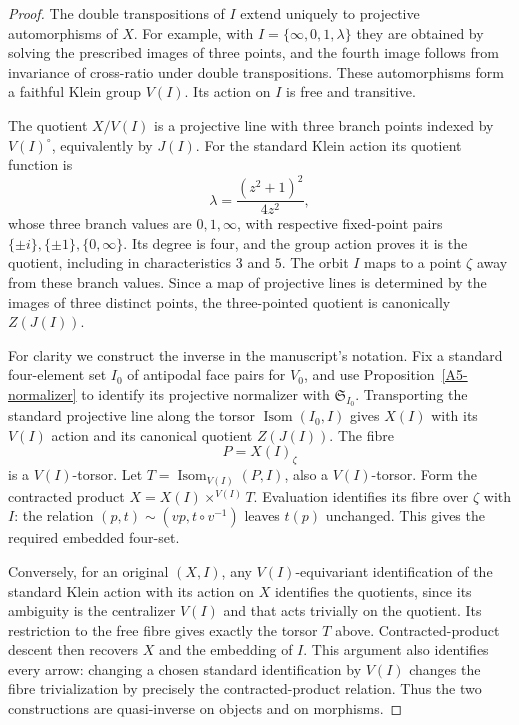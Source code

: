 \begin{proof}
The double transpositions of $I$ extend uniquely to projective automorphisms of $X$. For example, with $I=\{\infty,0,1,\lambda\}$ they are obtained by solving the prescribed images of three points, and the fourth image follows from invariance of cross-ratio under double transpositions. These automorphisms form a faithful Klein group $V(I)$. Its action on $I$ is free and transitive.

The quotient $X/V(I)$ is a projective line with three branch points indexed by $V(I)^\circ$, equivalently by $J(I)$. For the standard Klein action its quotient function is
\[
 \lambda=\frac{(z^2+1)^2}{4z^2},
\]
whose three branch values are $0,1,\infty$, with respective fixed-point pairs $\{\pm i\},\{\pm1\},\{0,\infty\}$. Its degree is four, and the group action proves it is the quotient, including in characteristics $3$ and $5$. The orbit $I$ maps to a point $\zeta$ away from these branch values. Since a map of projective lines is determined by the images of three distinct points, the three-pointed quotient is canonically $Z(J(I))$.

For clarity we construct the inverse in the manuscript's notation. Fix a standard four-element set $I_0$ of antipodal face pairs for $V_0$, and use Proposition~\ref{A5-normalizer} to identify its projective normalizer with $\mathfrak S_{I_0}$. Transporting the standard projective line along the torsor $\operatorname{Isom}(I_0,I)$ gives $X(I)$ with its $V(I)$ action and its canonical quotient $Z(J(I))$. The fibre
\[
 P=X(I)_\zeta
\]
is a $V(I)$-torsor. Let $T=\operatorname{Isom}_{V(I)}(P,I)$, also a $V(I)$-torsor. Form the contracted product $X=X(I)\times^{V(I)}T$. Evaluation identifies its fibre over $\zeta$ with $I$: the relation $(p,t)\sim(vp,t\circ v^{-1})$ leaves $t(p)$ unchanged. This gives the required embedded four-set.

Conversely, for an original $(X,I)$, any $V(I)$-equivariant identification of the standard Klein action with its action on $X$ identifies the quotients, since its ambiguity is the centralizer $V(I)$ and that acts trivially on the quotient. Its restriction to the free fibre gives exactly the torsor $T$ above. Contracted-product descent then recovers $X$ and the embedding of $I$. This argument also identifies every arrow: changing a chosen standard identification by $V(I)$ changes the fibre trivialization by precisely the contracted-product relation. Thus the two constructions are quasi-inverse on objects and on morphisms.
\end{proof}

